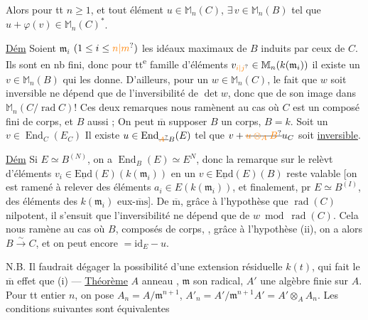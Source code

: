 Alors pour tt $n\geq1$, et tout élément $u\in\mathbb M_n(C)$,
$\exists\,v\in\mathbb M_n(B)$ tel que $u+\varphi(v)\in\mathbb M_n(C)^*$.

\uline{Dém}
Soient $\mathfrak m_i$ $(1\leq i\leq\unsure{n|m})$ les idéaux maximaux de
$B$ induits par ceux de $C$. Ils sont en nb fini,
donc pour tt\textsuperscript{e} famille d'éléments $v_{\unsure{i|j}}\in\mathbb M_n(k(\mathfrak m_i))$
il existe un $v\in\mathbb M_n(B)$ qui les donne. D'ailleurs,
pour un $w\in\mathbb M_n(C)$, le fait que $w$ soit
inversible ne dépend que de l'inversibilité de $\det w$,
donc que de son image dans $\mathbb M_n(C/\operatorname{rad} C)$! Ces
deux remarques nous ramènent au cas où $C$ est
un composé fini de corps, et $B$ aussi ; On
peut $\overline{\mathrm m}$ supposer $B$ un corps, $B=k$.
Soit un $v\in\operatorname{End}_C(E_C)$
Il existe $u\in\operatorname{End}_{\deleted{\unsure{A}}B}(E)$
tel que $v+\deleted{\unsure{u\otimes_A B}}u_C$ soit \uline{inversible}.

\uline{Dém} Si $E\simeq B^{(N)}$, on a $\operatorname{End}_B(E)\simeq E^N$,
donc la remarque sur le relèvt d'éléments $v_i\in
\underline{\mathrm{End}}(E)(k(\mathfrak m_i))$ en un $v\in\underline{\mathrm{End}}(E)(B)$ reste valable
[on est ramené à relever des éléments 
$a_i\in E(k(\mathfrak m_i))$, et finalement, pr $E\simeq B^{(I)}$, des
éléments des $k(\mathfrak m_i)$ eux-$\overline{\mathrm m}\mathrm s$]. De $\overline{\mathrm m}$, grâce à
l'hypothèse que $\operatorname{rad}(C)$ nilpotent, il s'ensuit que
l'inversibilité ne dépend que de $w\bmod\operatorname{rad}(C)$.
Cela nous ramène au cas où $B$,  composés de corps,
,  grâce à l'hypothèse (ii), on a
alors $B\xrightarrow{\sim}C$, et on peut encore $=\mathrm{id}_E-u$.

N.B. Il faudrait dégager la possibilité d'une
extension résiduelle  $k(t)$, qui fait
le $\overline{\mathrm m}$ effet que (i) ---
\uline{Théorème} $A$ anneau ,  $\mathfrak m$ son radical, $A'$ une algèbre
finie sur $A$. Pour tt entier $n$, on pose $A_n=A/\mathfrak m^{n+1}$, $A'_n=A'/\mathfrak m^{n+1}A'=
A'\otimes_A A_n$.  Les conditions suivantes sont équivalentes

